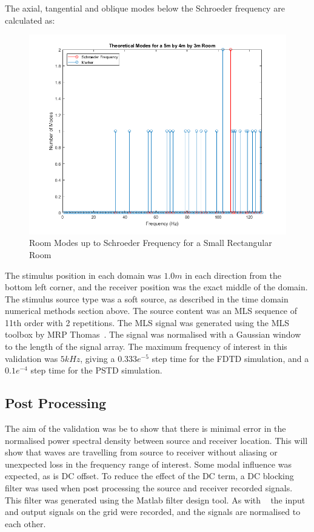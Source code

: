 The axial, tangential and oblique modes below the Schroeder frequency are calculated as:\\
\begin{figure}[H]
\centering
  \includegraphics[width=\textwidth]{./graphics/modesuptoschr.png}
  \caption{Room Modes up to Schroeder Frequency for a Small Rectangular Room}
\end{figure}

The stimulus position in each domain was $1.0m$ in each direction from the bottom left corner, and the receiver position was the exact middle of the domain. The stimulus source type was a soft source, as described in the time domain numerical methods section above. 
The source content was an MLS sequence of 11th order with 2 repetitions. The MLS signal was generated using the MLS toolbox by MRP Thomas~\cite{Mrt2008}. The signal was normalised with a Gaussian window to the length of the signal array. The maximum frequency of interest in this validation was $5kHz$, giving a $0.333e^{-5}$ step time for the FDTD simulation, and a $0.1e^{-4}$ step time for the PSTD simulation.

\subsection{Post Processing}
The aim of the validation was be to show that there is minimal error in the normalised power spectral density between source and receiver location. This will show that waves are travelling from source to receiver without aliasing or unexpected loss in the frequency range of interest. Some modal influence was expected, as is DC offset. To reduce the effect of the DC term, a DC blocking filter was used when post processing the source and receiver recorded signals. This filter was generated using the Matlab filter design tool. As with ~\cite{Murphy2014} the input and output signals on the grid were recorded, and the signals are normalised to each other.\\

